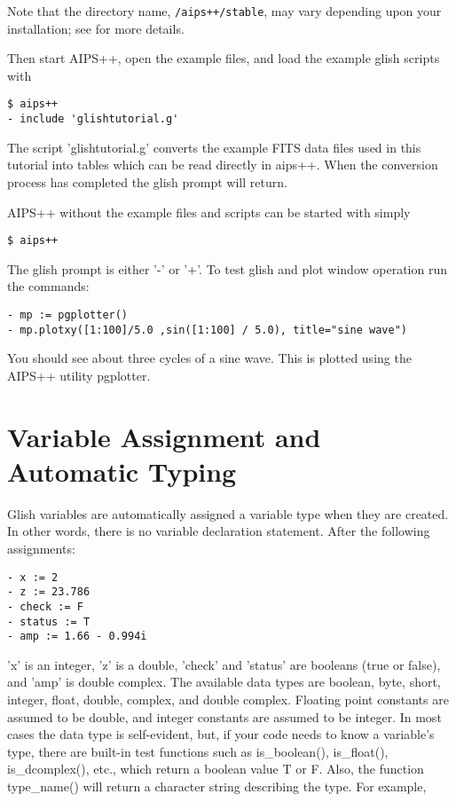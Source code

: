 Note that the directory name, \verb!/aips++/stable!, may vary depending upon
your installation; see  for more details.

Then start AIPS++, open the example files, and load the example glish
scripts with

\begin{verbatim}
$ aips++
- include 'glishtutorial.g'
\end{verbatim}
The script 'glishtutorial.g' converts the example FITS data files used
in this tutorial into tables which can be read directly in aips++.  When the 
conversion process has completed the glish prompt will return.

AIPS++ without the example files and scripts can be started with simply

\begin{verbatim}
$ aips++
\end{verbatim}

The glish prompt is either '-' or '+'.  To test glish and plot window
operation run the commands:

\begin{verbatim}
- mp := pgplotter()
- mp.plotxy([1:100]/5.0 ,sin([1:100] / 5.0), title="sine wave")
\end{verbatim}

You should see about three cycles of a sine wave. This is plotted
using the AIPS++ utility pgplotter.

\section{Variable Assignment and Automatic Typing}

    Glish variables are automatically assigned a variable type when they
are created.  In other words, there is no variable declaration statement.
After the following assignments:

\begin{verbatim}
- x := 2
- z := 23.786
- check := F
- status := T
- amp := 1.66 - 0.994i
\end{verbatim}

'x' is an integer, 'z' is a double, 'check' and 'status' are booleans (true
or false), and 'amp' is double complex.  The available data types are
boolean, byte, short, integer, float, double, complex, and double complex.
Floating point constants are assumed to be double, and integer constants
are assumed to be integer.  In most cases the data type is self-evident,
but, if your code needs to know a variable's type, there are built-in test
functions such as is\_boolean(), is\_float(), is\_dcomplex(), etc., which 
return a boolean value T or F.  Also, the function type\_name() will return
a character string describing the type.  For example,


